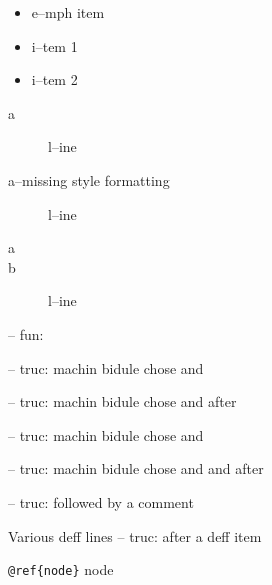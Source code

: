 \documentclass{book}
\begin{document}
\begin{titlepage}
\begin{itemize}[label=\emph{} after emph]
\item e--mph item
\end{itemize}

\begin{itemize}[label=\textbullet{} a--n itemize line]
\item i--tem 1
\item i--tem 2
\end{itemize}

\begin{description}
\item[a]
l--ine
\end{description}

\begin{description}
\item[a--missing style formatting]
l--ine
\end{description}

\begin{description}
\item[a]
%
%
\item[b]
%
l--ine
\end{description}

\hbox{}-- fun: 


\hbox{}-- truc: machin bidule chose and


%
\hbox{}-- truc: machin bidule chose and  after


%
\hbox{}-- truc: machin bidule chose and 


%
\hbox{}-- truc: machin bidule chose and and after


%
\hbox{}-- truc: followed by a comment


%
Various deff lines
\hbox{}-- truc: after a deff item


%

\texttt{@ref\{node\}} node


\end{titlepage}
\end{document}
